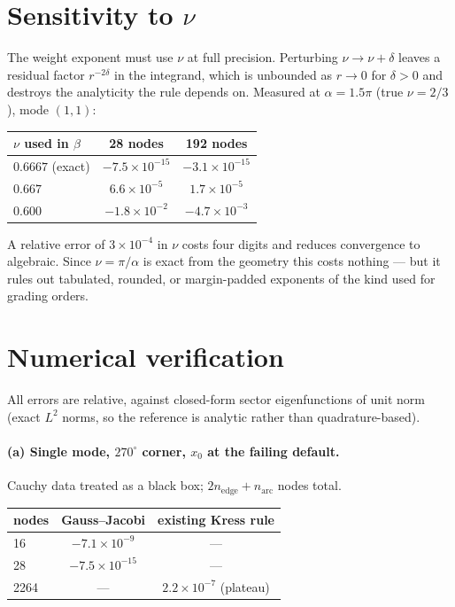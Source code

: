 \documentclass[11pt]{article}
\theoremstyle{remark}
\begin{document}
\section{Sensitivity to $\nu$}\label{sec:sens}

The weight exponent must use $\nu$ at full precision. Perturbing $\nu\to\nu+\delta$
leaves a residual factor $r^{-2\delta}$ in the integrand, which is unbounded as
$r\to0$ for $\delta>0$ and destroys the analyticity the rule depends on.
Measured at $\alpha=1.5\pi$ (true $\nu=2/3$), mode $(1,1)$:
\medskip

\begin{center}
\begin{tabular}{lcc}
\toprule
$\nu$ used in $\beta$ & 28 nodes & 192 nodes \\
\midrule
$0.6667$ (exact)      & $-7.5\times10^{-15}$ & $-3.1\times10^{-15}$\\
$0.667$               & $6.6\times10^{-5}$   & $1.7\times10^{-5}$\\
$0.600$               & $-1.8\times10^{-2}$  & $-4.7\times10^{-3}$\\
\bottomrule
\end{tabular}
\end{center}
\medskip

\noindent
A relative error of $3\times10^{-4}$ in $\nu$ costs four digits and reduces
convergence to algebraic. Since $\nu=\pi/\alpha$ is exact from the geometry this
costs nothing --- but it rules out tabulated, rounded, or margin-padded exponents
of the kind used for grading orders.

\section{Numerical verification}\label{sec:num}

All errors are relative, against closed-form sector eigenfunctions of unit norm
(exact $L^2$ norms, so the reference is analytic rather than quadrature-based).

\paragraph{(a) Single mode, $270^\circ$ corner, $x_0$ at the failing default.}
Cauchy data treated as a black box; $2n_{\text{edge}}+n_{\text{arc}}$ nodes total.
\medskip

\begin{center}
\begin{tabular}{lcc}
\toprule
nodes & Gauss--Jacobi & existing Kress rule\\
\midrule
16   & $-7.1\times10^{-9}$  & ---\\
28   & $-7.5\times10^{-15}$ & ---\\
2264 & ---                  & $2.2\times10^{-7}$ (plateau)\\
\bottomrule
\end{tabular}
\end{center}
\end{document}
